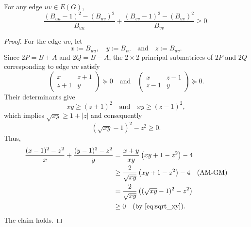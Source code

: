 \documentclass[10pt,a4paper]{amsart}
\begin{document}
\begin{claim}\label{claim:B_edge_inequality} For any edge $uv\in E(G)$, 
\[ \frac{(B_{uu}-1)^2-(B_{uv})^2}{B_{uu}} + \frac{(B_{vv}-1)^2-(B_{uv})^2}{B_{vv}}\ge 0.\]
\end{claim}

\begin{proof} For the edge $uv$, let 
\[x := B_{uu},\quad y := B_{vv}\quad \text{and}\quad z:=B_{uv}.\] 
Since $2P = B + A$ and $2Q = B-A$, the $2\times 2$ principal submatrices of $2P$ and $2Q$ corresponding to edge $uv$ satisfy
\[ 
\begin{pmatrix}
x & z+1\\
z+1& y
\end{pmatrix} \succeq 0 \quad \text{and}\quad 
\begin{pmatrix}
x & z-1\\
z-1 & y
\end{pmatrix} \succeq 0.\]
Their determinants give
\[xy\ge (z+1)^2 \quad \text{and}\quad xy\ge (z-1)^2,\]
which implies $ \sqrt{xy}\ge 1 + |z|$ and consequently
\begin{equation}\label{eq:sqrt_xy}
  (\sqrt{xy}-1)^2 - z^2\ge 0.
\end{equation}
Thus, 
\begin{align*}
    \frac{(x-1)^2 - z^2}{x} + \frac{(y-1)^2-z^2}{y}& = \frac{x+y}{xy}\left(xy +1 -z^2\right) - 4\\
    & \ge \frac{2}{\sqrt{xy}}\left(xy +1 -z^2\right) - 4 \quad (\text{AM-GM})\\
    & = \frac{2}{\sqrt{xy}}\left((\sqrt{xy} - 1)^2 -z^2\right)\\
    & \ge 0 \quad (\text{by \eqref{eq:sqrt_xy}}).
\end{align*}
The claim holds.
\end{proof}
\end{document}
